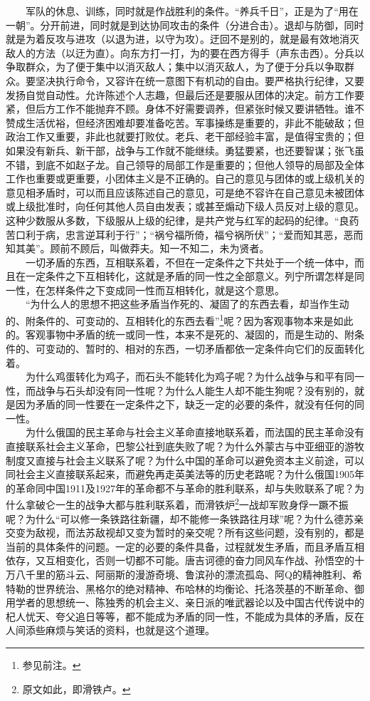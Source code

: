 \documentclass[cn,11pt,chinese]{elegantbook}
\begin{document}
　　军队的休息、训练，同时就是作战胜利的条件。“养兵千日”，正是为了“用在一朝”。分开前进，同时就是到达协同攻击的条件（分进合击）。退却与防御，同时就是为着反攻与进攻（以退为进，以守为攻）。迂回不是别的，就是最有效地消灭敌人的方法（以迂为直）。向东方打一打，为的要在西方得手（声东击西）。分兵以争取群众，为了便于集中以消灭敌人；集中以消灭敌人，为了便于分兵以争取群众。要坚决执行命令，又容许在统一意图下有机动的自由。要严格执行纪律，又要发扬自觉自动性。允许陈述个人志趣，但最后还是要服从团体的决定。前方工作要紧，但后方工作不能抛弃不顾。身体不好需要调养，但紧张时候又要讲牺牲。谁不赞成生活优裕，但经济困难却要准备吃苦。军事操练是重要的，非此不能破敌；但政治工作又重要，非此也就要打败仗。老兵、老干部经验丰富，是值得宝贵的；但如果没有新兵、新干部，战争与工作就不能继续。勇猛要紧，也还要智谋；张飞虽不错，到底不如赵子龙。自己领导的局部工作是重要的；但他人领导的局部及全体工作也重要或更重要，小团体主义是不正确的。自己的意见与团体的或上级机关的意见相矛盾时，可以而且应该陈述自己的意见，可是绝不容许在自己意见未被团体或上级批准时，向任何其他人员自由发表；或甚至煽动下级人员反对上级的意见。这种少数服从多数，下级服从上级的纪律，是共产党与红军的起码的纪律。“良药苦口利于病，忠言逆耳利于行”；“祸兮福所倚，福兮祸所伏”；“爱而知其恶，恶而知其美”。顾前不顾后，叫做莽夫。知一不知二，未为贤者。\\
　　一切矛盾的东西，互相联系着，不但在一定条件之下共处于一个统一体中，而且在一定条件之下互相转化，这就是矛盾的同一性之全部意义。列宁所谓怎样是同一性，在怎样条件之下变成同一性而互相转化，就是这个意思。\\
　　“为什么人的思想不把这些矛盾当作死的、凝固了的东西去看，却当作生动的、附条件的、可变动的、互相转化的东西去看”\footnote[11]{ 参见前注。}呢？因为客观事物本来是如此的。客观事物中矛盾的统一或同一性，本来不是死的、凝固的，而是生动的、附条件的、可变动的、暂时的、相对的东西，一切矛盾都依一定条件向它们的反面转化着。\\
　　为什么鸡蛋转化为鸡子，而石头不能转化为鸡子呢？为什么战争与和平有同一性，而战争与石头却没有同一性呢？为什么人能生人却不能生狗呢？没有别的，就是因为矛盾的同一性要在一定条件之下，缺乏一定的必要的条件，就没有任何的同一性。\\
　　为什么俄国的民主革命与社会主义革命直接地联系着，而法国的民主革命没有直接联系社会主义革命，巴黎公社到底失败了呢？为什么外蒙古与中亚细亚的游牧制度又直接与社会主义联系了呢？为什么中国的革命可以避免资本主义前途，可以同社会主义直接联系起来，而避免再走英美法等的历史老路呢？为什么俄国1905年的革命同中国1911及1927年的革命都不与革命的胜利联系，却与失败联系了呢？为什么拿破仑一生的战争大都与胜利联系着，而滑铁炉\footnote[12]{ 原文如此，即滑铁卢。}一战却军败身俘一蹶不振呢？为什么“可以修一条铁路往新疆，却不能修一条铁路往月球”呢？为什么德苏亲交变为敌视，而法苏敌视却又变为暂时的亲交呢？所有这些问题，没有别的，都是当前的具体条件的问题。一定的必要的条件具备，过程就发生矛盾，而且矛盾互相依存，又互相变化，否则一切都不可能。唐吉诃德的奋力同风车作战、孙悟空的十万八千里的筋斗云、阿丽斯的漫游奇境、鲁滨孙的漂流孤岛、阿Q的精神胜利、希特勒的世界统治、黑格尔的绝对精神、布哈林的均衡论、托洛茨基的不断革命、御用学者的思想统一、陈独秀的机会主义、亲日派的唯武器论以及中国古代传说中的杞人忧天、夸父追日等等，都不能成为矛盾的同一性，不能成为具体的矛盾，反在人间添些麻烦与笑话的资料，也就是这个道理。\\
\end{document}
